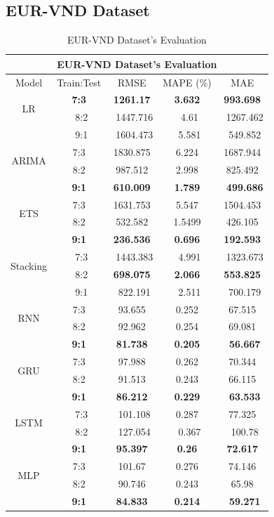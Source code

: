\documentclass{ieeeojies}
\begin{document}
\subsection{EUR-VND Dataset} 
\begin{table}[H]
    \centering
    \begin{tabular}{|c|c|c|c|c|}
         \hline
         \multicolumn{5}{|c|}{\textbf{EUR-VND Dataset's Evaluation}}\\
         \hline
         \centering Model & Train:Test & RMSE & MAPE (\%) & MAE\\
         \hline
         \multirow{2}{*}{LR} &\textbf{7:3} &\textbf{1261.17} &\textbf{3.632} &\textbf{993.698} \\ &\ 8:2 &\ 1447.716 &\ 4.61 &\ 1267.462 \\&\ 9:1 &\ 1604.473 &\ 5.581 &\ 549.852 \\
         \hline
         \multirow{2}{*}{ARIMA} & 7:3 & 1830.875 & 6.224 & 1687.944 \\ & 8:2 & 987.512 & 2.998 & 825.492 \\ & \textbf{9:1} & \textbf{610.009} & \textbf{1.789} &\ \textbf{499.686} \\
         \hline
         \multirow{2}{*}{ETS} & 7:3 & 1631.753 & 5.547 & 1504.453 \\ & 8:2 & 532.582&1.5499&426.105 \\& \textbf{9:1} & \textbf{236.536} & \textbf{0.696} & \textbf{192.593} \\
         \hline
         \multirow{2}{*}{Stacking} &\ 7:3 &\ 1443.383 &\ 4.991 &\ 1323.673 \\ &\ 8:2 &\textbf{698.075} &\textbf{2.066} &\textbf{553.825}\\&\ 9:1 &\ 822.191 &\ 2.511 &\ 700.179 \\
         \hline
         \multirow{2}{*}{RNN} & 7:3 & 93.655 & 0.252 & 67.515 \\ & 8:2 & 92.962 & 0.254 & 69.081 \\ & \textbf{9:1} & \textbf{81.738} & \textbf{0.205} &\ \textbf{56.667} \\
         \hline
         \multirow{2}{*}{GRU} & 7:3 & 97.988 & 0.262 & 70.344 \\ & 8:2 & 91.513 & 0.243 & 66.115 \\ & \textbf{9:1} & \textbf{86.212} & \textbf{0.229} &\ \textbf{63.533} \\
         \hline
         \multirow{2}{*}{LSTM} &\ 7:3 &\ 101.108 &0.287 &77.325\\ &\ 8:2 &\ 127.054&\ 0.367 &\ 100.78 \\&\textbf{9:1}&\textbf{95.397} &\textbf{0.26} &\textbf{72.617} \\
         \hline
         \multirow{2}{*}{MLP} & 7:3 & 101.67 & 0.276 & 74.146 \\ & 8:2 & 90.746 & 0.243 & 65.98 \\ & \textbf{9:1} & \textbf{84.833} & \textbf{0.214} &\ \textbf{59.271} \\
         \hline
    \end{tabular}
    \caption{EUR-VND Dataset's Evaluation}
    \label{vcbresult}
\end{table}
\end{document}
